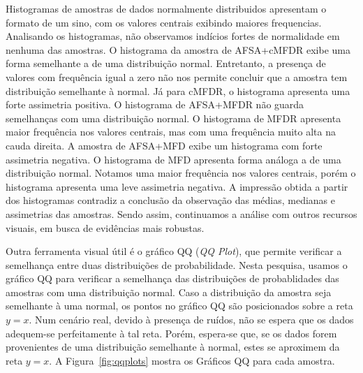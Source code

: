 \documentclass[conference]{IEEEtran}
\begin{document}
Histogramas de amostras de dados normalmente distribuidos apresentam o formato de um sino, com os valores centrais exibindo maiores frequencias.
Analisando os histogramas, não observamos indícios fortes de normalidade em nenhuma das amostras.
O histograma da amostra de AFSA+cMFDR exibe uma forma semelhante a de uma distribuição normal. 
Entretanto, a presença de valores com frequência igual a zero não nos permite concluir que a amostra tem distribuição semelhante à normal.
Já para cMFDR, o histograma apresenta uma forte assimetria positiva.
O histograma de AFSA+MFDR não guarda semelhanças com uma distribuição normal.
O histograma de MFDR apresenta maior frequência nos valores centrais, mas com uma frequência muito alta na cauda direita.
A amostra de AFSA+MFD exibe um histograma com forte assimetria negativa.
O histograma de MFD apresenta forma análoga a de uma distribuição normal.
Notamos uma maior frequência nos valores centrais, porém o histograma apresenta uma leve assimetria negativa. 
A impressão obtida a partir dos histogramas contradiz a conclusão da observação das médias, medianas e assimetrias das amostras. Sendo assim, continuamos a análise com outros recursos visuais, em busca de evidências mais robustas.

Outra ferramenta visual útil é o gráfico QQ (\textit{QQ Plot}), que permite verificar a semelhança entre duas distribuições de probabilidade. Nesta pesquisa, usamos o gráfico QQ para verificar a semelhança das distribuições de probablidades das amostras com uma distribuição normal. Caso a distribuição da amostra seja semelhante à uma normal, os pontos no gráfico QQ são posicionados sobre a reta $y = x$. Num cenário real, devido à presença de ruídos, não se espera que os dados adequem-se perfeitamente à tal reta. Porém, espera-se que, se os dados forem provenientes de uma distribuição semelhante à normal, estes se aproximem da reta $y = x$.
A Figura~\ref{fig:qqplots} mostra os Gráficos QQ para cada amostra.
\end{document}
